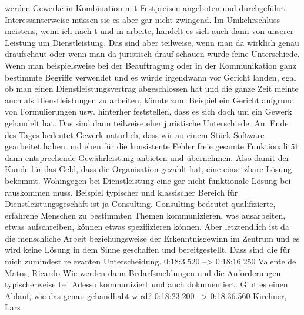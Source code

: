 werden Gewerke in Kombination mit Festpreisen angeboten und durchgeführt. Interessanterweise müssen sie es aber gar nicht zwingend. Im Umkehrschluss meistens, wenn ich nach t und m arbeite, handelt es sich auch dann von unserer Leistung um Dienstleistung. Das sind aber teilweise, wenn man da wirklich genau draufschaut oder wenn man da juristisch drauf schauen würde feine Unterschiede. Wenn man beispielsweise bei der Beauftragung oder in der Kommunikation ganz bestimmte Begriffe verwendet und es würde irgendwann vor Gericht landen, egal ob man einen Dienstleistungsvertrag abgeschlossen hat und die ganze Zeit meinte auch als Dienstleistungen zu arbeiten, könnte zum Beispiel ein Gericht aufgrund von Formulierungen usw. hinterher feststellen, dass es sich doch um ein Gewerk gehandelt hat. Das sind dann teilweise eher juristische Unterschiede. Am Ende des Tages bedeutet Gewerk natürlich, dass wir an einem Stück Software gearbeitet haben und eben für die konsistente Fehler freie gesamte Funktionalität dann entsprechende Gewährleistung anbieten und übernehmen. Also damit der Kunde für das Geld, dass die Organisation gezahlt hat, eine einsetzbare Lösung bekommt. Wohingegen bei Dienstleistung eine gar nicht funktionale Lösung bei rauskommen muss. Beispiel typischer und klassischer Bereich für Dienstleistungsgeschäft ist ja Consulting. Consulting bedeutet qualifizierte, erfahrene Menschen zu bestimmten Themen kommunizieren, was ausarbeiten, etwas aufschreiben, können etwas spezifizieren können. Aber letztendlich ist da die menschliche Arbeit beziehungsweise der Erkenntnisgewinn im Zentrum und es wird keine Lösung in dem Sinne geschaffen und bereitgestellt. Dass sind die für mich zumindest relevanten Unterscheidung. 
0:18:3.520 --> 0:18:16.250
Valente de Matos, Ricardo
Wie werden dann Bedarfsmeldungen und die Anforderungen typischerweise bei Adesso kommuniziert und auch dokumentiert. Gibt es einen Ablauf, wie das genau gehandhabt wird?
0:18:23.200 --> 0:18:36.560
Kirchner, Lars
